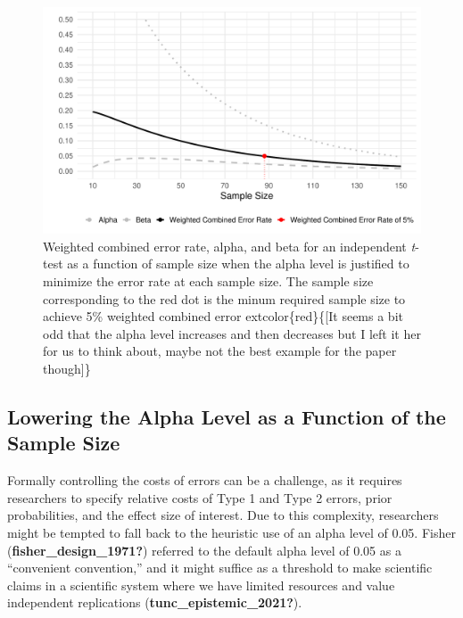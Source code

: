 \documentclass[
  english,
  ,jou, a4paper,floatsintext]{apa6}
\begin{document}
\begin{figure}
\centering
\includegraphics{Justify_in_Practice_files/figure-latex/error-plot-1.pdf}
\caption{\label{fig:error-plot}Weighted combined error rate, alpha, and beta for an independent \emph{t}-test as a function of sample size when the alpha level is justified to minimize the error rate at each sample size. The sample size corresponding to the red dot is the minum required sample size to achieve 5\% weighted combined error extcolor\{red\}\{{[}It seems a bit odd that the alpha level increases and then decreases but I left it her for us to think about, maybe not the best example for the paper though{]}\}}
\end{figure}

\hypertarget{lowering-the-alpha-level-as-a-function-of-the-sample-size}{%
\subsection{Lowering the Alpha Level as a Function of the Sample Size}\label{lowering-the-alpha-level-as-a-function-of-the-sample-size}}

Formally controlling the costs of errors can be a challenge, as it requires researchers to specify relative costs of Type 1 and Type 2 errors, prior probabilities, and the effect size of interest. Due to this complexity, researchers might be tempted to fall back to the heuristic use of an alpha level of 0.05. Fisher (\textbf{fisher\_design\_1971?}) referred to the default alpha level of 0.05 as a ``convenient convention,'' and it might suffice as a threshold to make scientific claims in a scientific system where we have limited resources and value independent replications (\textbf{tunc\_epistemic\_2021?}).
\end{document}
